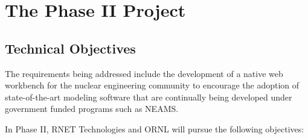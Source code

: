 
\section{The Phase II Project}
\label{sec:phaseII}


\subsection{Technical Objectives}

The requirements being addressed include the development of a native web
workbench for the nuclear engineering community to encourage the adoption of 
state-of-the-art modeling software that are continually being developed under 
government funded programs such as NEAMS. 

In Phase II, RNET Technologies and ORNL will pursue the following objectives:

